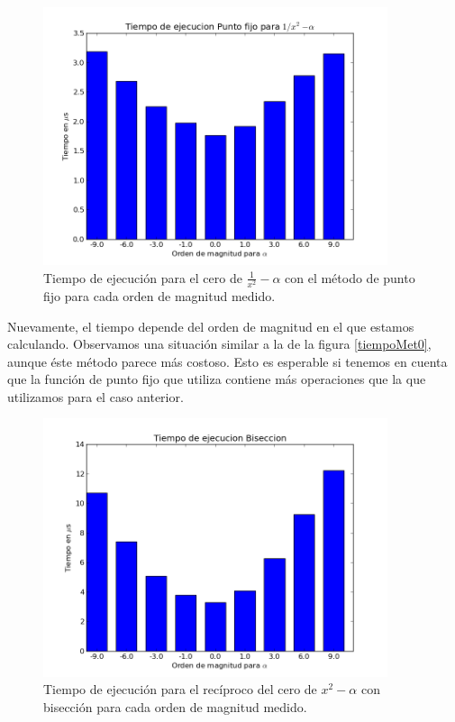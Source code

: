 \begin{figure}[H]
  \centering
    \includegraphics[width=0.9\textwidth]{../data/Tiempometodo2.png}
    \caption{Tiempo de ejecución para el cero de $\frac{1}{x^2} - \alpha$ con el método de punto fijo para cada orden de magnitud medido.}
    \label{tiempoMet2}
\end{figure}

Nuevamente, el tiempo depende del orden de magnitud en el que estamos calculando. Observamos una situación similar a la de la figura \ref{tiempoMet0}, aunque éste método parece más costoso. Esto es esperable si tenemos en cuenta que la función de punto fijo que utiliza contiene más operaciones que la que utilizamos para  el caso anterior.

\begin{figure}[H]
  \centering
    \includegraphics[width=0.9\textwidth]{../data/Tiempometodo3.png}
    \caption{Tiempo de ejecución para el recíproco del cero de ${x^2} - \alpha$ con bisección para cada orden de magnitud medido.}
    \label{tiempoMet3}
\end{figure}

